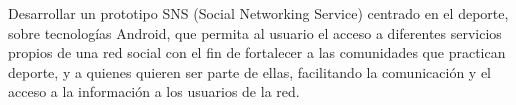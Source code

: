 Desarrollar un prototipo SNS (Social Networking Service) centrado en el deporte, sobre tecnologías Android, que permita al usuario el acceso a diferentes servicios propios de una red social con el fin de fortalecer a las comunidades que practican deporte, y a quienes quieren ser parte de ellas, facilitando la comunicación y el acceso a la información a los usuarios de la red.
